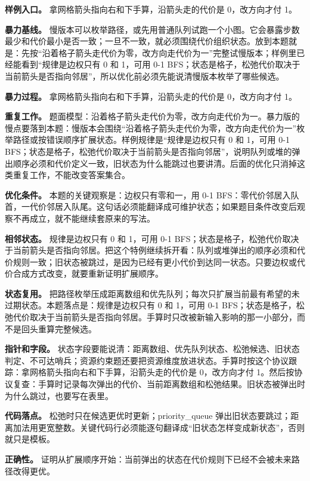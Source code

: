 \textbf{样例入口。} 拿网格箭头指向右和下手算，沿箭头走的代价是 0，改方向才付 1。

\textbf{暴力基线。} 慢版本可以枚举路径，或先用普通队列试跑一个小图。它会暴露步数最少和代价最小是否一致；一旦不一致，就必须围绕代价组织状态。放到本题就是：先按“沿着格子箭头走代价为零，改方向走代价为一”完整试慢版本；样例里已经能看到“规律是边权只有 0 和 1，可用 0-1 BFS；状态是格子，松弛代价取决于当前箭头是否指向邻居”，所以优化前必须先能说清慢版本枚举了哪些候选。

\textbf{暴力过程。} 拿网格箭头指向右和下手算，沿箭头走的代价是 0，改方向才付 1。

\textbf{重复工作。} 题面模型：沿着格子箭头走代价为零，改方向走代价为一。暴力版的慢点要落到本题：慢版本会围绕“沿着格子箭头走代价为零，改方向走代价为一”枚举路径或按错误顺序扩展状态。样例规律是“规律是边权只有 0 和 1，可用 0-1 BFS；状态是格子，松弛代价取决于当前箭头是否指向邻居”，说明队列或堆的弹出顺序必须和代价定义一致，旧状态为什么能跳过也要讲清。后面的优化只消掉这类重复工作，不能改变答案集合。

\textbf{优化条件。} 本题的关键观察是：边权只有零和一，用 0-1 BFS：零代价邻居入队首，一代价邻居入队尾。这句话必须能翻译成可维护状态；如果题目条件改变后观察不再成立，就不能继续套原来的写法。

\textbf{相邻状态。} 规律是边权只有 0 和 1，可用 0-1 BFS；状态是格子，松弛代价取决于当前箭头是否指向邻居。把这个特例继续拆开看：队列或堆弹出的顺序必须和代价规则一致；旧状态被跳过，是因为已经有更小代价到达同一状态。只要边权或代价合成方式改变，就要重新证明扩展顺序。

\textbf{状态复用。} 把路径枚举压成距离数组和优先队列；每次只扩展当前最有希望的未过期状态。本题落点是：规律是边权只有 0 和 1，可用 0-1 BFS；状态是格子，松弛代价取决于当前箭头是否指向邻居。手算时只改被新输入影响的那一小部分，而不是回头重算完整候选。

\textbf{指针和字段。} 状态字段要能说清：距离数组、优先队列状态、松弛候选、旧状态判定、不可达哨兵；资源约束题还要把资源维度放进状态。手算时按这个协议跟踪：拿网格箭头指向右和下手算，沿箭头走的代价是 0，改方向才付 1。然后按协议复查：手算时记录每次弹出的代价、当前距离数组和松弛结果。旧状态被弹出时为什么跳过，也要写在表里。

\textbf{代码落点。} 松弛时只在候选更优时更新；priority\_queue 弹出旧状态要跳过；距离加法用更宽整数。关键代码行必须能逐句翻译成“旧状态怎样变成新状态”，否则就只是模板。

\textbf{正确性。} 证明从扩展顺序开始：当前弹出的状态在代价规则下已经不会被未来路径改得更优。

